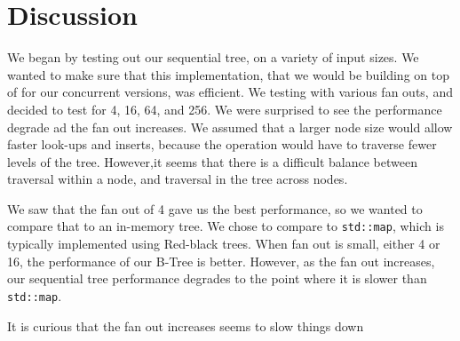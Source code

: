 \documentclass{sig-alternate}
\begin{document}
\section{Discussion}
We began by testing out our sequential tree, on a variety of input sizes.  We wanted to make sure that this implementation, that we would be building on top of for our concurrent versions, was efficient.  We testing with various fan outs, and decided to test for 4, 16, 64, and 256.  We were surprised to see the performance degrade ad the fan out increases.  We assumed that a larger node size would allow faster look-ups and inserts, because the operation would have to traverse fewer levels of the tree.  However,it seems that there is a difficult balance between traversal within a node, and traversal in the tree across nodes.

We saw that the fan out of 4 gave us the best performance, so we wanted to compare that to an in-memory tree.  We chose to compare to \texttt{std::map}, which is typically implemented using Red-black trees.  When fan out is small, either 4 or 16, the performance of our B-Tree is better.  However, as the fan out increases, our sequential tree performance degrades to the point where it is slower than \texttt{std::map}.

It is curious that the fan out increases seems to slow things down
\end{document}
